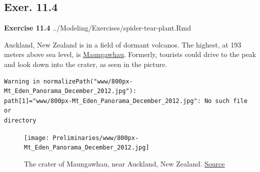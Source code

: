 \documentclass[
  letterpaper,
  DIV=11,
  numbers=noendperiod,
  oneside]{article}
\begin{document}
\begin{multicols}{2}
\begin{table}
\begin{minipage}[t]{\linewidth}
{}

\end{minipage}%
\newline
\begin{minipage}[t]{\linewidth}

{\centering 

\hypertarget{exer.-11.4}{%
\section*{Exer. 11.4}\label{exer.-11.4}}

\textbf{Exercise 11.4} ../Modeling/Exercises/spider-tear-plant.Rmd

}

\end{minipage}%
\newline
\begin{minipage}[t]{\linewidth}

{\centering 

Auckland, New Zealand is in a field of dormant volcanos. The highest, at
193 meters above sea level, is
\href{https://en.wikipedia.org/wiki/Maungawhau_/_Mount_Eden}{Maungawhau}.
Formerly, tourists could drive to the peak and look down into the
crater, as seen in the picture.

}

\end{minipage}%
\newline
\begin{minipage}[t]{\linewidth}

{\centering 

\begin{verbatim}
Warning in normalizePath("www/800px-Mt_Eden_Panorama_December_2012.jpg"):
path[1]="www/800px-Mt_Eden_Panorama_December_2012.jpg": No such file or
directory
\end{verbatim}

\begin{figure}

{\centering \texttt{[image: Preliminaries/www/800px-Mt\_Eden\_Panorama\_December\_2012.jpg]}

}

\caption{\label{fig-Maungawhau}The crater of Maungawhau, near Auckland,
New Zealand.
\href{https://commons.wikimedia.org/wiki/File:Mt._Eden_Panorama_December_2012.jpg}{Source}}

\end{figure}

}


\end{minipage}
\end{table}
\end{multicols}
\end{document}
